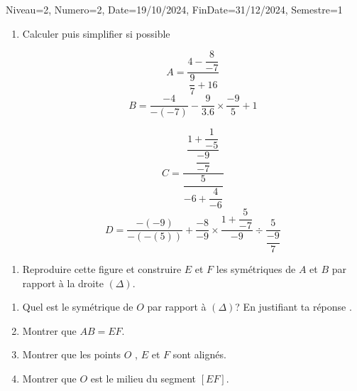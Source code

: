 \documentclass[a4paper,12pt]{article}
\begin{document}
\begin{Maquette}[DM]{Niveau=2, Numero=2, Date=19/10/2024, FinDate=31/12/2024, Semestre=1}

\begin{exercice}
\begin{enumerate}
\item Calculer puis simplifier si possible

\begin{minipage}{.5\linewidth}
$$A=\dfrac{4-\dfrac{8}{-7}}{\dfrac{9}{7}+16} $$
$$B=\dfrac{-4}{-(-7)}-\dfrac{9}{3.6}\times\dfrac{-9}{5}+1 $$
\end{minipage}%
\begin{minipage}{.5\linewidth}
$$C=\dfrac{\dfrac{1+\dfrac{1}{-5}}{\dfrac{-9}{-7}}}{\dfrac{5}{-6+\dfrac{4}{-6}}} $$
$$D=\dfrac{-(-9)}{-(-(5))}+\dfrac{-8}{-9}\times\dfrac{1+\dfrac{5}{-7}}{-9}\div\dfrac{5}{\dfrac{-9}{7}}$$
\end{minipage}
\end{enumerate}
\end{exercice}

\begin{exercice}
\begin{enumerate}
\item Reproduire cette figure et construire $E$ et $F$ les symétriques de $A$ et $B$ par rapport à la droite  $(\Delta)$.
\end{enumerate}
    \begin{minipage}{.6\textwidth}
      \begin{enumerate}
\item Quel est le symétrique de $O$ par rapport à $(\Delta)$? En justifiant ta réponse .
\item Montrer que $AB=EF$.
\item Montrer que les points $O$ , $E$ et $F$ sont alignés.
\item Montrer que $O$ est le milieu du segment $[EF]$.
\end{enumerate}
\end{minipage}\hfill %
\begin{minipage}{.38\textwidth}
\end{minipage}
\end{exercice}


\end{Maquette}
\end{document}

